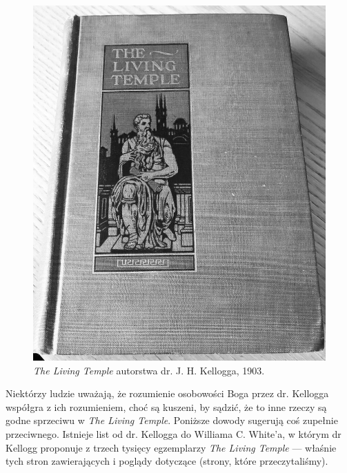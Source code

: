 \begin{figure}[hp]
    \centering
    \includegraphics[width=1\linewidth]{images/TLT.jpg}
    \caption*{\textit{The Living Temple} autorstwa dr. J. H. Kellogga, 1903.}
    \label{fig:tlt}
\end{figure}

Niektórzy ludzie uważają, że rozumienie osobowości Boga przez dr. Kellogga współgra z ich rozumieniem, choć są kuszeni, by sądzić, że to inne rzeczy są godne sprzeciwu w \textit{The Living Temple}. Poniższe dowody sugerują coś zupełnie przeciwnego. Istnieje list od dr. Kellogga do Williama C. White’a, w którym dr Kellogg proponuje  z trzech tysięcy egzemplarzy \textit{The Living Temple} — właśnie tych stron zawierających  i poglądy dotyczące  (strony, które przeczytaliśmy).

